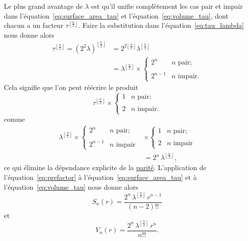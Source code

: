 Le plus grand avantage de $\lambda$ est qu'il unifie complètement les cas pair
et impair dans l'équation~\eqref{eq:surface_area_tau} et
l'équation~\eqref{eq:volume_tau}, dont chacun a un facteur $\tau^{\left\lfloor
\frac{n}{2} \right\rfloor}$. Faire la substitution dans
l'équation~\eqref{eq:tau_lambda} nous donne alors
\[
\begin{split}
\tau^{\left\lfloor \frac{n}{2} \right\rfloor} = (2^2\lambda)^{\left\lfloor \frac{n}{2} \right\rfloor} & = 2^{2\left\lfloor \frac{n}{2} \right\rfloor} \lambda^{\left\lfloor \frac{n}{2} \right\rfloor} \\
& = \lambda^{\left\lfloor \frac{n}{2} \right\rfloor}\times
\begin{cases}
 2^n & n \text{ pair}; \\ \\
 2^{n-1} & n \text{ impair}.
 \end{cases}
 \end{split}
\]
Cela signifie que l'on peut réécrire le produit
\[
\tau^{\left\lfloor \frac{n}{2} \right\rfloor}\times \begin{cases}
1 & n \text{ pair}; \\ \\
2 & n \text{ impair}.
\end{cases}
\]
comme
\begin{equation}
\label{eq:prefactor}
\begin{split}
\lambda^{\left\lfloor \frac{n}{2} \right\rfloor} \times
\begin{cases}
 2^n & n \text{ pair}; \\ \\
 2^{n-1} & n \text{ impair}
 \end{cases}
 & \times
\begin{cases}
 1 & n \text{ pair}; \\ \\
 2 & n \text{ impair}
 \end{cases}
\\ & = 2^n\,\lambda^{\left\lfloor \frac{n}{2} \right\rfloor},
\end{split}
\end{equation}
ce qui élimine la dépendance explicite de la
\href{https://fr.wikipedia.org/wiki/Parité_(arithmétique)}{parité}.
L'application de \linebreak l'équation~\eqref{eq:prefactor} à
l'équation~\eqref{eq:surface_area_tau} et à l'équation~\eqref{eq:volume_tau}
nous donne alors
\begin{equation}
\label{eq:surface_area_lambda}
S_n(r) = \frac{2^n\,\lambda^{\left\lfloor \frac{n}{2} \right\rfloor}\,r^{n-1}}{(n-2)!!}
\end{equation}
et
\begin{equation}
\label{eq:volume_lambda}
V_n(r) = \frac{2^n\,\lambda^{\left\lfloor \frac{n}{2} \right\rfloor}\,r^n}{n!!}.
\end{equation}

